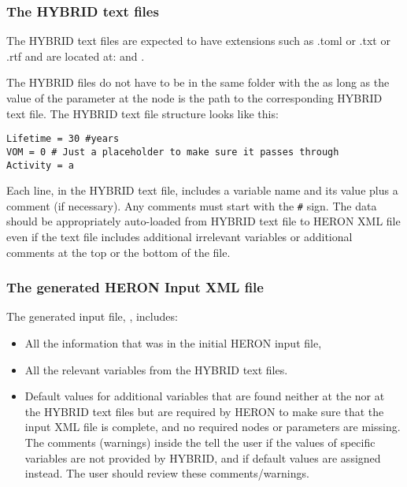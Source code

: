 \subsubsection{The HYBRID text files}
The HYBRID text files are expected to have extensions such as .toml or .txt or .rtf and are located at: 
 and 
. 

The HYBRID files do not have to be in the same folder with the  as long as the value of the  parameter at the  node is the path to the corresponding HYBRID text file. The HYBRID text file structure looks like this:
\begin{lstlisting}
Lifetime = 30 #years
VOM = 0 # Just a placeholder to make sure it passes through
Activity = a
\end{lstlisting}

Each line, in the HYBRID text file, includes a variable name and its value plus a comment (if necessary). Any comments must start with the \verb|#| sign. The data should be appropriately auto-loaded from HYBRID text file to HERON XML file even if the text file includes additional irrelevant variables or additional comments at the top or the bottom of the file.

\subsubsection{The generated HERON Input XML file}
The generated input file, , includes:
\begin{itemize}
\item All the information that was in the initial HERON input file,       
\item All the relevant variables from the HYBRID text files.
\item Default values for additional variables that are found neither at the  nor at the HYBRID text files but are required by HERON to make sure that the input XML file is complete, and no required nodes or parameters are missing. The comments (warnings) inside the  tell the user if the values of specific variables are not provided by HYBRID, and if default values are assigned instead. The user should review these comments/warnings.
\end{itemize}


